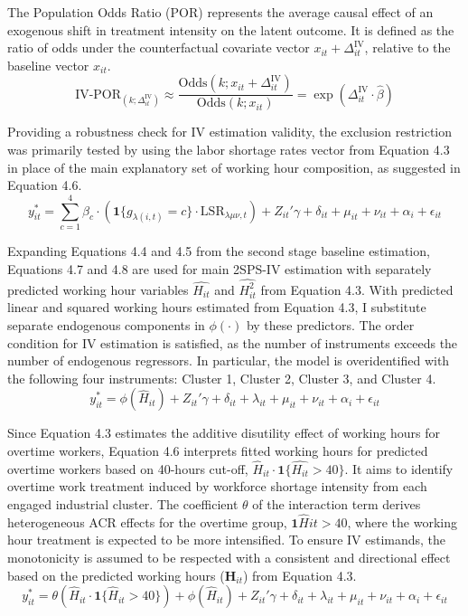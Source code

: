\documentclass[
  12pt,
]{article}
\begin{document}
The Population Odds Ratio (POR) represents the average causal effect of
an exogenous shift in treatment intensity on the latent outcome. It is
defined as the ratio of odds under the counterfactual covariate vector
\({x}_{it} + \Delta_{it}^{\text{IV}}\), relative to the baseline vector
\({x}_{it}\). \[
\text{IV-POR}_{(k;\Delta_{it}^{\text{IV}})} \approx 
\frac{\text{Odds}(k; {x}_{it} + \Delta_{it}^{\text{IV}})}{\text{Odds}(k; {x}_{it})} 
= \exp(\Delta_{it}^{\text{IV}} \cdot \hat{\beta})
\]

Providing a robustness check for IV estimation validity, the exclusion
restriction was primarily tested by using the labor shortage rates
vector from Equation 4.3 in place of the main explanatory set of working
hour composition, as suggested in Equation 4.6. \[
y^*_{it} =\sum_{c=1}^{4} \beta_c \cdot \left(\mathbf{1}\{g_{\lambda(i,t)} = c\} \cdot \text{LSR}_{\lambda\mu\nu,t} \right) + Z_{it}' \gamma + \delta_{it} + \mu_{it} + \nu_{it} + \alpha_i + \epsilon_{it}
\tag{4.6}
\]

Expanding Equations 4.4 and 4.5 from the second stage baseline
estimation, Equations 4.7 and 4.8 are used for main 2SPS-IV estimation
with separately predicted working hour variables \(\hat{H_{it}}\) and
\(\hat{H^2_{it}}\) from Equation 4.3. With predicted linear and squared
working hours estimated from Equation 4.3, I substitute separate
endogenous components in \(\phi(\cdot)\) by these predictors. The order
condition for IV estimation is satisfied, as the number of instruments
exceeds the number of endogenous regressors. In particular, the model is
overidentified with the following four instruments: Cluster 1, Cluster
2, Cluster 3, and Cluster 4. \[
y^*_{it} = \phi(\hat{H}_{it}) + Z_{it}' \gamma + \delta_{it} + \lambda_{it} + \mu_{it} + \nu_{it} +\alpha_i + \epsilon_{it}
\tag{4.7}
\]

Since Equation 4.3 estimates the additive disutility effect of working
hours for overtime workers, Equation 4.6 interprets fitted working hours
for predicted overtime workers based on 40-hours cut-off,
\(\hat{H}_{it}\cdot \mathbf{1}\{\hat{H_{it}} > 40\}\). It aims to
identify overtime work treatment induced by workforce shortage intensity
from each engaged industrial cluster. The coefficient \(\theta\) of the
interaction term derives heterogeneous ACR effects for the overtime
group, \(\mathbf{1}{\hat{H}{it} > 40}\), where the working hour
treatment is expected to be more intensified. To ensure IV estimands,
the monotonicity is assumed to be respected with a consistent and
directional effect based on the predicted working hours
(\(\mathbf{H}_{it}\)) from Equation 4.3. \[
y^*_{it} = \theta(\hat{H}_{it} \cdot \mathbf{1}\{\hat{H}_{it} > 40\}) + \phi(\hat{H}_{it}) + Z_{it}' \gamma + \delta_{it} + \lambda_{it} + \mu_{it} + \nu_{it} +\alpha_i + \epsilon_{it}
\tag{4.8}
\]
\end{document}
